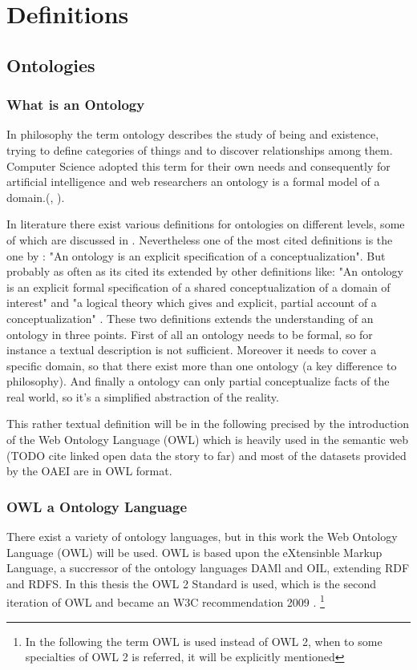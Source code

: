 \documentclass[11pt,titlepage,oneside,openany,a4paper]{report}
\begin{document}
	\section{Definitions}
	\label{sec:defintions}

	\subsection{Ontologies}
	\label{sec:ontologies_def}
	\subsubsection{What is an Ontology}
In philosophy the term ontology describes the study of being and existence, trying to define categories of things and to discover relationships among them. Computer Science adopted this term for their own needs and consequently for artificial intelligence  and web researchers an ontology is a formal model of a domain.(\cite{ehrig2006ontology}, \cite{paulheim2011ontology}). 

In literature there exist various definitions for ontologies on different levels, some of which are discussed in \cite{Guarino:1997}. Nevertheless one of the most cited definitions is the one by \cite{Gruber:1995}: "An ontology is an explicit specification of a conceptualization".  But probably as often as its cited its extended by other definitions like: "An ontology is an explicit formal specification of a shared conceptualization of a domain of interest"\cite{Studer:1998} and "a logical theory which gives and explicit, partial account of a conceptualization" \cite{Guarino95}. These two definitions extends the understanding of an ontology in three points. First of all an ontology needs to be formal, so for instance a textual description is not sufficient.\cite{Studer:1998} Moreover it needs to cover a specific domain, so that there exist more than one ontology (a key difference to philosophy). And finally a ontology can only partial conceptualize facts of the real world, so it's a simplified abstraction of the reality.\cite{ehrig2006ontology}

This rather textual definition will be in the following precised by the introduction of the Web Ontology Language (OWL) which is  heavily used in the semantic web (TODO cite linked open data the story to far) and most of the datasets provided by the OAEI are in OWL format. \cite{dragisicresults}
\subsubsection{OWL a Ontology Language}
There exist a variety of ontology languages, but in this work the Web Ontology Language (OWL) will be used. OWL is based upon the eXtensinble Markup Language, a succressor of the ontology languages DAMl and OIL, extending RDF and RDFS. In this thesis the OWL 2 Standard is used, which is the second iteration of OWL and became an W3C recommendation 2009 \cite{OWL2a}. \footnote{In the following the term OWL is used instead of OWL 2, when to some specialties of OWL 2 is referred, it will be explicitly mentioned}
\end{document}
